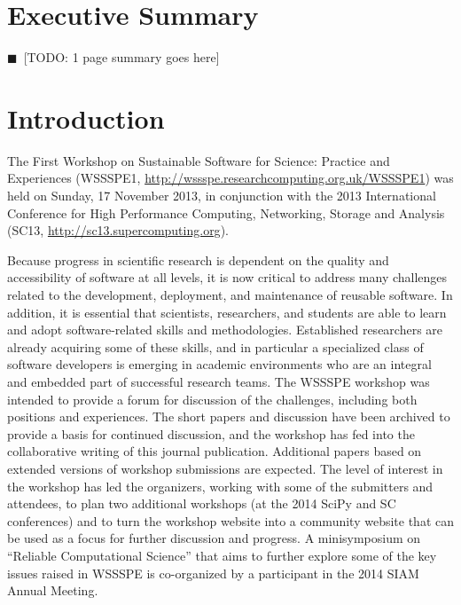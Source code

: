 \documentclass[11pt, oneside]{amsart}
\newcommand{\todo}[1]{{\color{blue}$\blacksquare$~\textsf{[TODO: #1]}}}
\newcommand{\note}[1]{ {\textcolor{red}    { #1 }}}
\begin{document}
\pagebreak

\section*{Executive Summary}

\todo{1 page summary goes here}

\pagebreak

\section{Introduction}

The First Workshop on Sustainable Software for Science: Practice and
Experiences (WSSSPE1,
\url{http://wssspe.researchcomputing.org.uk/WSSSPE1}) was held on
Sunday, 17 November 2013, in conjunction with the 2013 International
Conference for High Performance Computing, Networking, Storage and
Analysis (SC13, \url{http://sc13.supercomputing.org}).

Because progress in scientific research is dependent on the quality and
accessibility of software at all levels, it is now critical to address many
challenges related to the development, deployment, and maintenance of reusable
software.
In addition, it is essential that scientists,
researchers, and students are able to learn and adopt software-related skills
and methodologies. Established researchers are already acquiring some of these
skills, and in particular a specialized class of software developers is
emerging in academic environments who are an integral and embedded part of
successful research teams. The WSSSPE workshop was intended to provide a forum
for discussion of the challenges, including both positions and experiences. The
short papers and discussion have been archived to provide a basis for continued
discussion, and the workshop has fed into the collaborative writing of this
journal publication.  Additional papers based on extended versions of workshop
submissions are expected.  The level of interest in the workshop has led the
organizers, working with some of the submitters and attendees, to plan two
additional workshops (at the 2014 SciPy and SC conferences) and to turn the
workshop website into a community website that can be used as a focus for
further discussion and progress.  A minisymposium on ``Reliable Computational
Science'' that aims to further explore some of the key issues raised in WSSSPE
is co-organized by a participant in the 2014 SIAM Annual Meeting.
\end{document}
